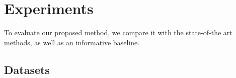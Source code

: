 

\section{Experiments}\label{sec.4}

To evaluate our proposed method, we compare it with the state-of-the art methods, as well as an informative baseline.

\subsection{Datasets}\label{sec.4.1}

\begin{figure}
\scalebox{.4}
{
}
\end{figure}
